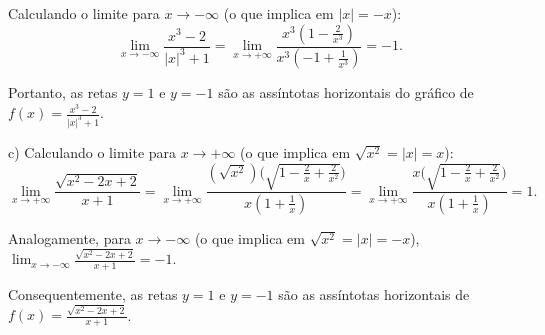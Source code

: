 \documentclass{article}
\begin{document}
{\begin{newpage}
\par Calculando o limite para $x\rightarrow -\infty $ (o que implica em $|x|=-x$):
\begin{equation*} \displaystyle{\lim_{x\to -\infty }} \frac{x^3 -2}{|x|^3 + 1} = \displaystyle{\lim_{x\to +\infty }} \frac{x^3(1 - \frac{2}{x^3})}{x^3(-1 + \frac{1}{x^3})} = -1.\end{equation*}
\par Portanto, as retas $y=1$ e $y=-1$ são as assíntotas horizontais do gráfico de $\displaystyle{f(x)= \frac{x^3 -2}{|x|^3 + 1}}$.
\par
\vspace{0.3cm}
c) Calculando o limite para $x\rightarrow +\infty $ (o que implica em $\sqrt{x^2}=|x|=x$):
\begin{equation*} \displaystyle{\lim_{x\to +\infty }} \frac{\sqrt{x^2 - 2x + 2}}{x+1} = \displaystyle{\lim_{x\to +\infty }} \frac{(\sqrt{x^{2}})\Big(\sqrt{1 - \frac{2}{x} + \frac{2}{x^2}}\Big)}{x(1 + \frac{1}{x})} = \displaystyle{\lim_{x\to +\infty }} \frac{x\Big(\sqrt{1 - \frac{2}{x} + \frac{2}{x^2}}\Big)}{x(1 + \frac{1}{x})} = 1.\end{equation*}
\par Analogamente, para $x\rightarrow -\infty $ (o que implica em $\sqrt{x^2}=|x|=-x$), $\displaystyle{\lim_{x\to -\infty }} \frac{\sqrt{x^2 - 2x + 2}}{x+1} = -1.$
\par Consequentemente, as retas $y=1$ e $y=-1$ são as assíntotas horizontais de $\displaystyle{f(x) = \frac{\sqrt{x^2 - 2x + 2}}{x+1}}$.
\par
\vspace{0.3cm}

\end{newpage}}
\end{document}
